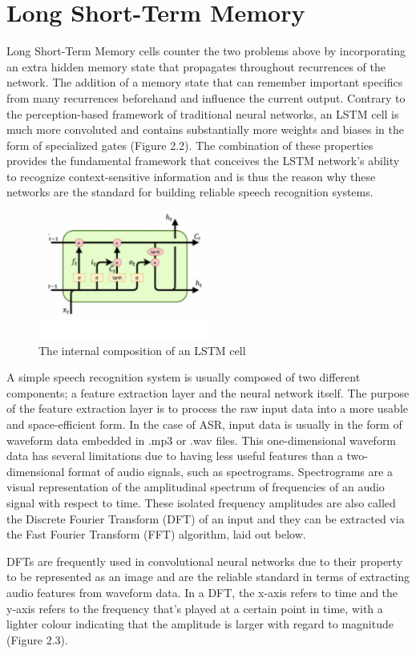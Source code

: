 \section{Long Short-Term Memory}

Long Short-Term Memory cells counter the two problems above by incorporating an extra hidden memory state that propagates throughout recurrences of the network. The addition of a memory state that can remember important specifics from many recurrences beforehand and influence the current output. Contrary to the perception-based framework of traditional neural networks, an LSTM cell is much more convoluted and contains substantially more weights and biases in the form of specialized gates (Figure 2.2). The combination of these properties provides the fundamental framework that conceives the LSTM network’s ability to recognize context-sensitive information and is thus the reason why these networks are the standard for building reliable speech recognition systems. 

\begin{figure}[th]
    \centering
    \includegraphics[width=0.5\textwidth]{Figures/lstmarch.png}
    \decoRule
    \caption[LSTM Cell]{The internal composition of an LSTM cell}
    \label{fig:LSTMCell}
\end{figure}

A simple speech recognition system is usually composed of two different components; a feature extraction layer and the neural network itself. The purpose of the feature extraction layer is to process the raw input data into a more usable and space-efficient form. In the case of ASR, input data is usually in the form of waveform data embedded in .mp3 or .wav files. This one-dimensional waveform data has several limitations due to having less useful features than a two-dimensional format of audio signals, such as spectrograms. Spectrograms are a visual representation of the amplitudinal spectrum of frequencies of an audio signal with respect to time. These isolated frequency amplitudes are also called the Discrete Fourier Transform (DFT) of an input and they can be extracted via the Fast Fourier Transform (FFT) algorithm, laid out below.
\newline\par
DFTs are frequently used in convolutional neural networks due to their property to be represented as an image and are the reliable standard in terms of extracting audio features from waveform data. In a DFT, the x-axis refers to time and the y-axis refers to the frequency that’s played at a certain point in time, with a lighter colour indicating that the amplitude is larger with regard to magnitude (Figure 2.3).

